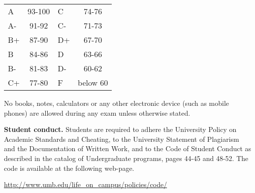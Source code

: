 \documentclass{article}
\begin{document}
\begin{center}
\begin{tabular}{lc|lc}
A & 93-100 & C  & 74-76 \\
A-& 91-92  & C- & 71-73 \\
B+& 87-90  & D+ & 67-70 \\
B & 84-86  & D  & 63-66\\
B-& 81-83  & D- & 60-62\\
C+& 77-80  & F  & below 60\\
\end{tabular}

\end{center}

No books, notes, calculators or any other electronic device (such as mobile phones) are allowed during any exam unless otherwise stated.

\medskip
\noindent \textbf{Student conduct.} Students  are required to adhere the University Policy on Academic Standards and Cheating, to the University Statement of Plagiarism and the Documentation of Written Work, and to the Code of Student Conduct as described in the catalog of Undergraduate programs, pages 44-45 and 48-52. The code is available at the following web-page.

\noindent\url{http://www.umb.edu/life_on_campus/policies/code/}
\end{document}
